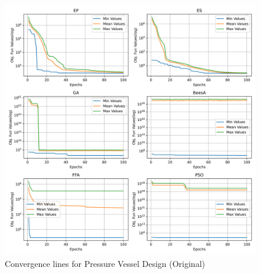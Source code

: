 
\begin{figure}[H]
\centering
\caption{Convergence lines for Pressure Vessel Design (Original)}
\label{fig:pressure_vessel_problem_original_convergence}
\includegraphics[width= 0.4 \textwidth]{images/pressure_vessel_problem_original_convergence.png}
\end{figure}

    